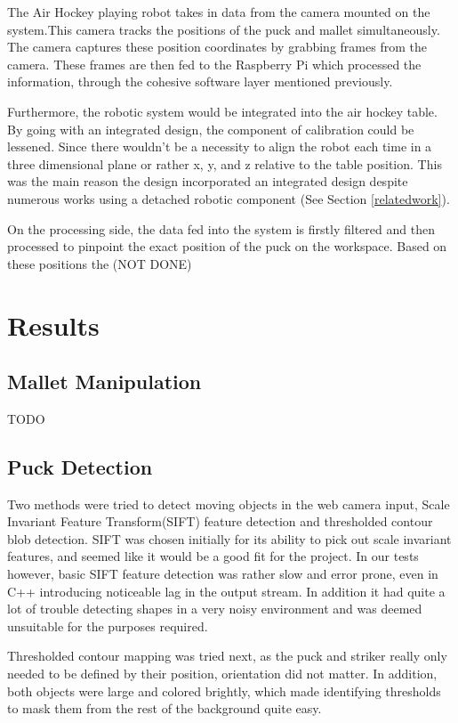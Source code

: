 \documentclass[letterpaper, 12 pt, conference]{ieeeconf}
\begin{document}
The Air Hockey playing robot takes in data from the camera mounted on the system.This camera tracks the positions of the puck and mallet simultaneously. The camera captures these position coordinates by grabbing frames from the camera.
These frames are then fed to the Raspberry Pi which processed the information, through the cohesive software layer mentioned previously.

Furthermore, the robotic system would be integrated into the air hockey table. By going with an integrated design, the component of calibration could be lessened. Since there wouldn’t be a necessity to align the robot each time in a three dimensional plane or rather x, y, and z relative to the table position. This was the main reason the design incorporated an integrated design despite numerous works using a detached robotic component (See Section \ref{relatedwork}).

On the processing side, the data fed into the system is firstly filtered and then processed to pinpoint the exact position of the puck on the workspace. Based on these positions the (NOT DONE)

\section{Results}
\label{results}
\subsection{Mallet Manipulation}
\label{results-malletmanipulation}
TODO

\subsection{Puck Detection}
\label{results-puckdetection}
Two methods were tried to detect moving objects in the web camera input, Scale Invariant Feature Transform(SIFT) feature detection and thresholded contour blob detection. SIFT was chosen initially for its ability to pick out scale invariant features, and seemed like it would be a good fit for the project. In our tests however, basic SIFT feature detection was rather slow and error prone, even in C++ introducing noticeable lag in the output stream. In addition it had quite a lot of trouble detecting shapes in a very noisy environment and was deemed unsuitable for the purposes required. 


Thresholded contour mapping was tried next, as the puck and striker really only needed to be defined by their position, orientation did not matter. In addition, both objects were large and colored brightly, which made identifying thresholds to mask them from the rest of the background quite easy. 
\end{document}
